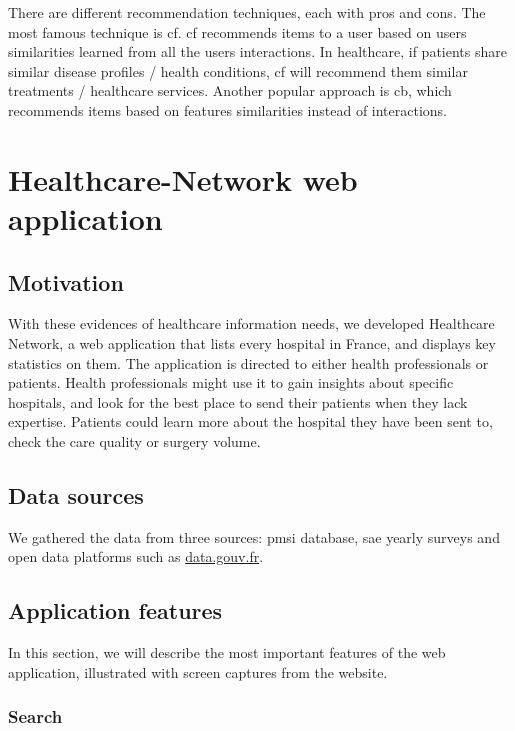 There are different recommendation techniques, each with pros and cons. The most famous technique is \ac{cf}. \ac{cf} recommends items to a user based on users similarities learned from all the users interactions. In healthcare, if patients share similar disease profiles / health conditions, \ac{cf} will recommend them similar treatments / healthcare services. Another popular approach is \ac{cb}, which recommends items based on features similarities instead of interactions.

\section{Healthcare-Network web application}

\subsection{Motivation}

With these evidences of healthcare information needs, we developed Healthcare Network, a web application that lists every hospital in France, and displays key statistics on them. The application is directed to either health professionals or patients. Health professionals might use it to gain insights about specific hospitals, and look for the best place to send their patients when they lack expertise. Patients could learn more about the hospital they have been sent to, check the care quality or surgery volume.

\subsection{Data sources}

We gathered the data from three sources: \ac{pmsi} database, \ac{sae} yearly surveys and open data platforms such as \href{https://data.gouv.fr}{data.gouv.fr}.

\subsection{Application features}

In this section, we will describe the most important features of the web application, illustrated with screen captures from the website.

\subsubsection{Search}

